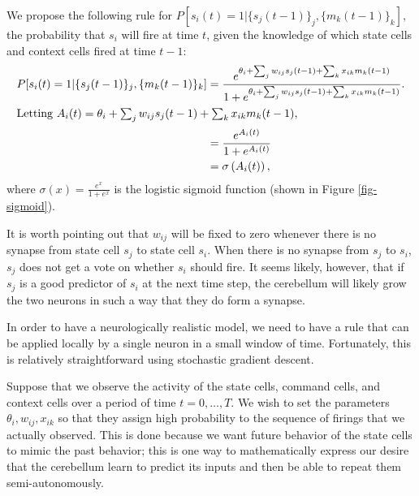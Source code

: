 \documentclass{article}
\theoremstyle{definition}
\begin{document}
We propose the following rule for $P[s_i(t)=1 | \{s_j(t-1)\}_j,
  \{m_k(t-1)\}_k]$, the probability that $s_i$ will fire at time $t$,
given the knowledge of which state cells and context cells fired at
time $t-1$:
\begin{align*}
P[s_i(t)=1 | \{s_j(t-1)\}_j, \{m_k(t-1)\}_k] &= \frac{e^{\theta_i +
    \sum_j w_{ij} s_j(t-1) + \sum_k x_{ik} m_k(t-1)} }{1 + e^{\theta_i +
    \sum_j w_{ij} s_j(t-1) + \sum_k x_{ik} m_k(t-1)}}.\\
\intertext{Letting $A_i(t) = \theta_i + \sum_j w_{ij} s_j(t-1) +
  \sum_k x_{ik} m_k(t-1)$,}
&= \frac{e^{A_i(t)}}{1 + e^{A_i(t)}}\\
&= \sigma\left(A_i(t)\right),\\
\end{align*}
where $\sigma(x) = \frac{e^x}{1 + e^x}$ is the logistic sigmoid
function (shown in Figure \ref{fig-sigmoid}).

It is worth pointing out that $w_{ij}$ will be fixed to zero whenever
there is no synapse from state cell $s_j$ to state cell $s_i$. When
there is no synapse from $s_j$ to $s_i$, $s_j$ does not get a vote on
whether $s_i$ should fire. It seems likely, however, that if $s_j$ is
a good predictor of $s_i$ at the next time step, the cerebellum will
likely grow the two neurons in such a way that they do form a synapse.

In order to have a neurologically realistic model, we need to have a
rule that can be applied locally by a single neuron in a small window
of time. Fortunately, this is relatively straightforward using
stochastic gradient descent.

Suppose that we observe the activity of the state cells, command
cells, and context cells over a period of time $t=0, \dots, T$. We
wish to set the parameters $\theta_i, w_{ij}, x_{ik}$ so that they
assign high probability to the sequence of firings that we actually
observed. This is done because we want future behavior of the state
cells to mimic the past behavior; this is one way to mathematically
express our desire that the cerebellum learn to predict its inputs and
then be able to repeat them semi-autonomously.
\end{document}
